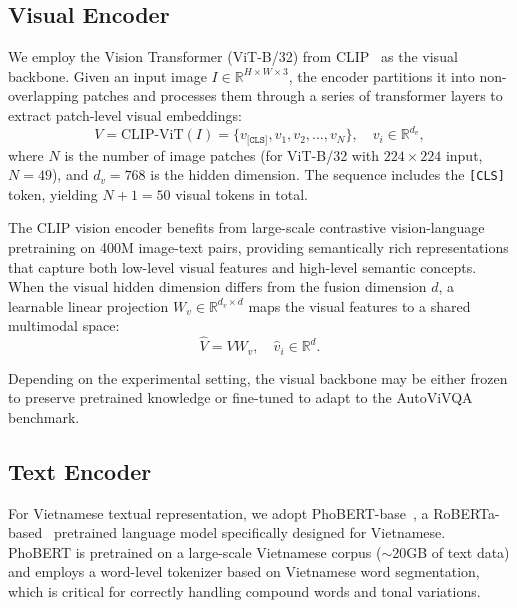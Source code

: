 \subsection{Visual Encoder}
\label{sec:method:visual}

We employ the Vision Transformer (ViT-B/32) from CLIP~\cite{radford2021learning} as the visual backbone. Given an input image $I \in \mathbb{R}^{H \times W \times 3}$, the encoder partitions it into non-overlapping patches and processes them through a series of transformer layers to extract patch-level visual embeddings:
\begin{equation}
    V = \text{CLIP-ViT}(I) = \{v_{\texttt{[CLS]}}, v_1, v_2, \ldots, v_N\}, \quad v_i \in \mathbb{R}^{d_v},
    \label{eq:visual_enc}
\end{equation}
where $N$ is the number of image patches (for ViT-B/32 with $224 \times 224$ input, $N = 49$), and $d_v = 768$ is the hidden dimension. The sequence includes the \texttt{[CLS]} token, yielding $N + 1 = 50$ visual tokens in total.

The CLIP vision encoder benefits from large-scale contrastive vision-language pretraining on 400M image-text pairs, providing semantically rich representations that capture both low-level visual features and high-level semantic concepts. When the visual hidden dimension differs from the fusion dimension $d$, a learnable linear projection $W_v \in \mathbb{R}^{d_v \times d}$ maps the visual features to a shared multimodal space:
\begin{equation}
    \hat{V} = V W_v, \quad \hat{v}_i \in \mathbb{R}^{d}.
\end{equation}

Depending on the experimental setting, the visual backbone may be either frozen to preserve pretrained knowledge or fine-tuned to adapt to the AutoViVQA benchmark.

\subsection{Text Encoder}
\label{sec:method:text}

For Vietnamese textual representation, we adopt PhoBERT-base~\cite{nguyen2020phobert}, a RoBERTa-based~\cite{liu2019roberta} pretrained language model specifically designed for Vietnamese. PhoBERT is pretrained on a large-scale Vietnamese corpus ($\sim$20GB of text data) and employs a word-level tokenizer based on Vietnamese word segmentation, which is critical for correctly handling compound words and tonal variations.

